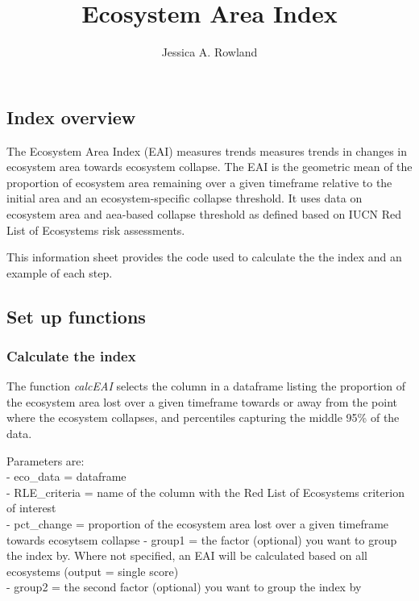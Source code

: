 \documentclass[]{article}
\title{Ecosystem Area Index}
\author{Jessica A. Rowland}
\date{}
\begin{document}
\maketitle

\subsection{Index overview}\label{index-overview}

The Ecosystem Area Index (EAI) measures trends measures trends in
changes in ecosystem area towards ecosystem collapse. The EAI is the
geometric mean of the proportion of ecosystem area remaining over a
given timeframe relative to the initial area and an ecosystem-specific
collapse threshold. It uses data on ecosystem area and aea-based
collapse threshold as defined based on IUCN Red List of Ecosystems risk
assessments.

This information sheet provides the code used to calculate the the index
and an example of each step.

\subsection{Set up functions}\label{set-up-functions}

\subsubsection{Calculate the index}\label{calculate-the-index}

The function \emph{calcEAI} selects the column in a dataframe listing
the proportion of the ecosystem area lost over a given timeframe towards
or away from the point where the ecosystem collapses, and percentiles
capturing the middle 95\% of the data.

Parameters are:\\
- eco\_data = dataframe\\
- RLE\_criteria = name of the column with the Red List of Ecosystems
criterion of interest\\
- pct\_change = proportion of the ecosystem area lost over a given
timeframe towards ecosytsem collapse - group1 = the factor (optional)
you want to group the index by. Where not specified, an EAI will be
calculated based on all ecosystems (output = single score)\\
- group2 = the second factor (optional) you want to group the index by
\end{document}
